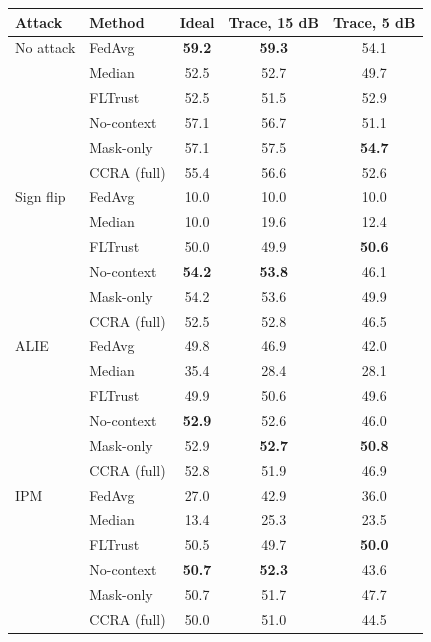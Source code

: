 \begin{tabular}{@{}llccc@{}}
\toprule
Attack & Method & Ideal & Trace, 15 dB & Trace, 5 dB \\
\midrule
No attack & FedAvg & \textbf{59.2} & \textbf{59.3} & 54.1 \\
 & Median & 52.5 & 52.7 & 49.7 \\
 & FLTrust & 52.5 & 51.5 & 52.9 \\
 & No-context & 57.1 & 56.7 & 51.1 \\
 & Mask-only & 57.1 & 57.5 & \textbf{54.7} \\
 & CCRA (full) & 55.4 & 56.6 & 52.6 \\
\midrule
Sign flip & FedAvg & 10.0 & 10.0 & 10.0 \\
 & Median & 10.0 & 19.6 & 12.4 \\
 & FLTrust & 50.0 & 49.9 & \textbf{50.6} \\
 & No-context & \textbf{54.2} & \textbf{53.8} & 46.1 \\
 & Mask-only & 54.2 & 53.6 & 49.9 \\
 & CCRA (full) & 52.5 & 52.8 & 46.5 \\
\midrule
ALIE & FedAvg & 49.8 & 46.9 & 42.0 \\
 & Median & 35.4 & 28.4 & 28.1 \\
 & FLTrust & 49.9 & 50.6 & 49.6 \\
 & No-context & \textbf{52.9} & 52.6 & 46.0 \\
 & Mask-only & 52.9 & \textbf{52.7} & \textbf{50.8} \\
 & CCRA (full) & 52.8 & 51.9 & 46.9 \\
\midrule
IPM & FedAvg & 27.0 & 42.9 & 36.0 \\
 & Median & 13.4 & 25.3 & 23.5 \\
 & FLTrust & 50.5 & 49.7 & \textbf{50.0} \\
 & No-context & \textbf{50.7} & \textbf{52.3} & 43.6 \\
 & Mask-only & 50.7 & 51.7 & 47.7 \\
 & CCRA (full) & 50.0 & 51.0 & 44.5 \\
\bottomrule
\end{tabular}

